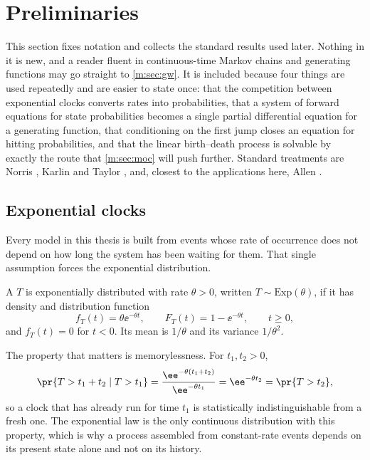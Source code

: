 \section{Preliminaries}
\label{m:sec:prelim}

This section fixes notation and collects the standard results used later. Nothing
in it is new, and a reader fluent in continuous-time Markov chains and generating
functions may go straight to \cref{m:sec:gw}. It is included because four things are
used repeatedly and are easier to state once: that the competition between
exponential clocks converts rates into probabilities, that a system of forward
equations for state probabilities becomes a single partial differential equation
for a generating function, that conditioning on the first jump closes an equation
for hitting probabilities, and that the linear birth--death process is solvable by
exactly the route that \cref{m:sec:moc} will push further. Standard treatments are
Norris \cite{Norris1997}, Karlin and Taylor \cite{KarlinTaylor1975}, and, closest to
the applications here, Allen \cite{Allen2010}.

\subsection{Exponential clocks}
\label{m:sec:exp}

Every model in this thesis is built from events whose rate of occurrence does not
depend on how long the system has been waiting for them. That single assumption
forces the exponential distribution.

\begin{definition}
\label{m:def:exp}
A \rv{} $T$ is exponentially distributed with rate $\theta>0$, written
$T\sim\mathrm{Exp}(\theta)$, if it has density and distribution function
\begin{equation*}
f_T(t) = \theta\ee^{-\theta t},
\qquad
F_T(t) = 1-\ee^{-\theta t},
\qquad t\ge0,
\end{equation*}
and $f_T(t)=0$ for $t<0$. Its mean is $1/\theta$ and its variance $1/\theta^2$.
\end{definition}

The property that matters is memorylessness. For $t_1,t_2>0$,
\begin{equation}
\label{m:eq:memoryless}
\pr{T > t_1+t_2 \mid T > t_1}
= \frac{\ee^{-\theta(t_1+t_2)}}{\ee^{-\theta t_1}}
= \ee^{-\theta t_2}
= \pr{T > t_2},
\end{equation}
so a clock that has already run for time $t_1$ is statistically indistinguishable
from a fresh one. The exponential law is the only continuous distribution with this
property, which is why a process assembled from constant-rate events depends on its
present state alone and not on its history.

